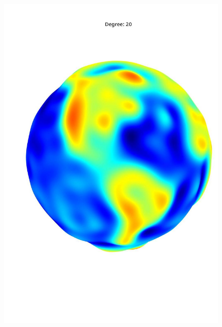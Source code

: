 \documentclass[a4paper]{article}
\theoremstyle{definition}
\begin{document}
\begin{figure}[h!]
\begin{minipage}{.245\textwidth}
        \includegraphics[width=0.95\linewidth]{media/med_20.jpg}
        \label{fig:med20}
    \end{minipage}
    \begin{minipage}{.245\textwidth}
        \centering

\end{minipage}
\end{figure}
\end{document}
